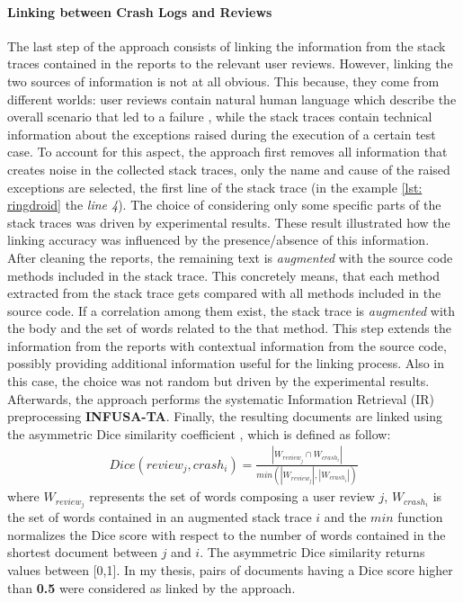 \paragraph{Linking between Crash Logs and Reviews}
The last step of the approach consists of linking the information from the stack traces contained in the reports to the relevant user reviews. 
However, linking the two sources of information is not at all obvious.
This because, they come from different worlds: user reviews contain natural human language which describe the overall scenario that led to a failure \cite{mernik}, while the stack traces contain technical information about the exceptions raised during the execution of a certain test case. 
To account for this aspect, the approach first removes all information that creates noise in the collected stack traces, only the name and cause of the raised exceptions are selected, \ie the first line of the stack trace (in the example \ref{lst: ringdroid} the \textit{line 4}). 
The choice of considering only some specific parts of the stack traces was driven by experimental results. 
These result illustrated how the linking accuracy was influenced by the presence/absence of this information. 
After cleaning the reports, the remaining text is \textit{augmented} with the source code methods included in the stack trace. 
This concretely means, that each method extracted from the stack trace gets compared with all methods included in the source code. 
If a correlation among them exist, the stack trace is \textit{augmented} with the body and the set of words related to the that method. 
This step extends the information from the reports with contextual information from the source code, possibly providing additional information useful for the linking process. Also in this case, the choice was not random but driven by the experimental results.
Afterwards, the approach performs the systematic Information Retrieval (IR) preprocessing \cite{BaezaYates:1999} \textbf{INFUSA-TA}.
Finally, the resulting documents are linked using the asymmetric Dice similarity coefficient \cite{BaezaYates:1999}, which is defined as
follow: 
\begin{align*}
Dice (review_j, crash_i) = \frac{|W_{review_j} \cap W_{crash_i}|}{\textit{min}(|W_{review_j}|, |W_{crash_i}|)}
\end{align*}
where $W_{review_j}$ represents the set of words composing a user review $j$, $W_{crash_i}$ is the set of words contained in an augmented stack trace $i$ and the $min$ function normalizes the Dice score with respect to the number of words contained in the shortest document between $j$ and $i$. 
The asymmetric Dice similarity returns values between [0,1]. 
In my thesis, pairs of documents having a Dice score higher than \textbf{0.5} were considered as linked by the approach.






